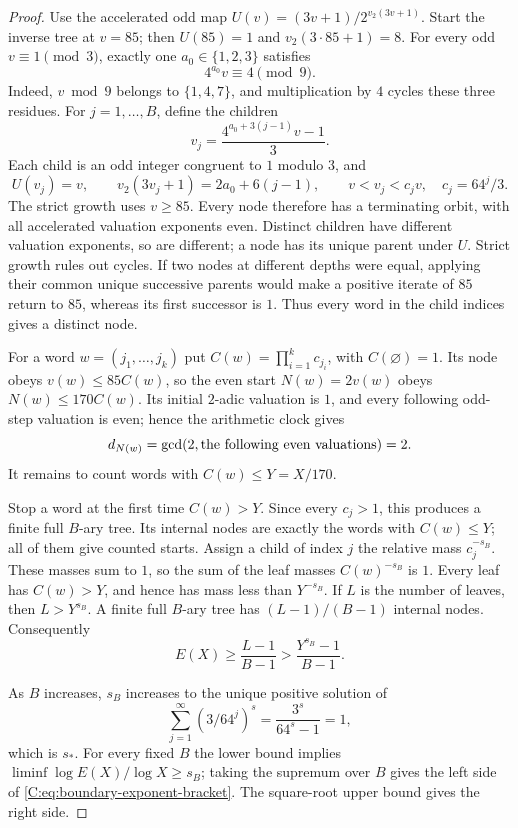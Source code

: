 \documentclass[11pt,a4paper]{article}
\theoremstyle{definition}
\theoremstyle{remark}
\numberwithin{equation}{section}
\begin{document}
\begin{proof}
Use the accelerated odd map
$U(v)=(3v+1)/2^{v_2(3v+1)}$. Start the inverse tree at $v=85$;
then $U(85)=1$ and $v_2(3\cdot85+1)=8$.
For every odd $v\equiv1\pmod3$, exactly one
$a_0\in\{1,2,3\}$ satisfies
\[
 4^{a_0}v\equiv4\pmod9.
\]
Indeed, $v\bmod9$ belongs to $\{1,4,7\}$, and multiplication by $4$
cycles these three residues. For $j=1,\ldots,B$, define the children
\[
 v_j=\frac{4^{a_0+3(j-1)}v-1}{3}.
\]
Each child is an odd integer congruent to $1$ modulo $3$, and
\[
 U(v_j)=v,\qquad
 v_2(3v_j+1)=2a_0+6(j-1),\qquad
 v<v_j< c_jv,\quad c_j=64^j/3.
\]
The strict growth uses $v\ge85$.
Every node therefore has a terminating orbit, with all accelerated
valuation exponents even. Distinct children have different valuation
exponents, so are different; a node has its unique parent under $U$.
Strict growth rules out cycles. If two nodes at different depths were
equal, applying their common unique successive parents would make a
positive iterate of $85$ return to $85$, whereas its first successor
is $1$. Thus every word in the child indices gives a distinct node.

For a word $w=(j_1,\ldots,j_k)$ put
$C(w)=\prod_{i=1}^k c_{j_i}$, with $C(\varnothing)=1$.
Its node obeys $v(w)\le85C(w)$, so the even start
$N(w)=2v(w)$ obeys $N(w)\le170C(w)$.
Its initial $2$-adic valuation is $1$, and every following odd-step
valuation is even; hence the arithmetic clock gives
\[
 d_{N(w)}=\gcd(2,\hbox{the following even valuations})=2.
\]
It remains to count words with $C(w)\le Y=X/170$.

Stop a word at the first time $C(w)>Y$. Since every $c_j>1$,
this produces a finite full $B$-ary tree. Its internal nodes are exactly
the words with $C(w)\le Y$; all of them give counted starts.
Assign a child of index $j$ the relative mass $c_j^{-s_B}$.
These masses sum to $1$, so the sum of the leaf masses
$C(w)^{-s_B}$ is $1$. Every leaf has $C(w)>Y$, and hence has
mass less than $Y^{-s_B}$. If $L$ is the number of leaves, then
$L>Y^{s_B}$. A finite full $B$-ary tree has $(L-1)/(B-1)$ internal
nodes. Consequently
\[
 E(X)\ge\frac{L-1}{B-1}>\frac{Y^{s_B}-1}{B-1}.
\]

As $B$ increases, $s_B$ increases to the unique positive solution of
\[
 \sum_{j=1}^{\infty}(3/64^j)^s
 =\frac{3^s}{64^s-1}=1,
\]
which is $s_*$. For every fixed $B$ the lower bound implies
$\liminf\log E(X)/\log X\ge s_B$; taking the supremum over $B$
gives the left side of \eqref{C:eq:boundary-exponent-bracket}.
The square-root upper bound gives the right side.
\end{proof}
\end{document}
